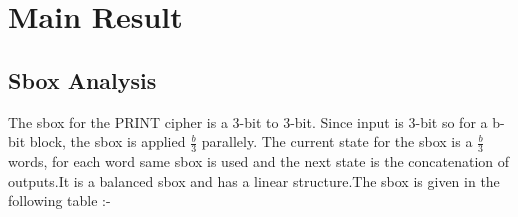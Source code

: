 \documentclass[journal=tosc,preprint]{iacrtrans}
\begin{document}
\section{Main Result}
\label{sec:main}

\subsection{Sbox Analysis}

The sbox for the PRINT cipher is a 3-bit to 3-bit. Since input is 3-bit so for a b-bit block, the sbox is applied $\frac{b}{3}$ parallely. The current state for the sbox is a $\frac{b}{3}$ words, for each word same sbox is used and the next state is the concatenation of outputs.It is a balanced sbox and has a linear structure.The sbox is given in the following table :- \newline

\begin{table}[ht]
	\centering
\end{table}
\end{document}
